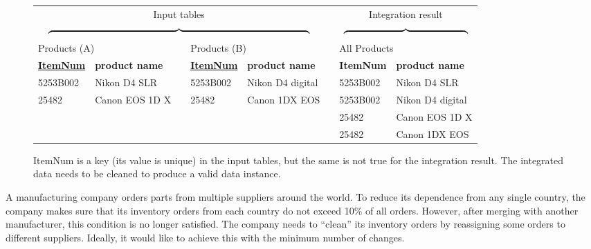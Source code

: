 \begin{figure}
	\small{\begin{tabular}{|l|l|l|l|l|l|l|l|}
		\multicolumn{5}{c}{Input tables} & \multicolumn{1}{l}{}& \multicolumn{2}{c}{Integration result}\\
		\multicolumn{5}{c}{$\overbrace{\rule{9.5cm}{0pt}}$} & \multicolumn{1}{l}{}& \multicolumn{2}{c}{$\overbrace{\rule{4.5cm}{0pt}}$}\\
		\multicolumn{2}{l}{Products (A)} & \multicolumn{1}{l}{} & \multicolumn{2}{l}{Products (B)} & \multicolumn{1}{l}{} & \multicolumn{2}{l}{All Products}\\
		\cline{1-2}\cline{4-5}\cline{7-8}
		\textbf{\underline{ItemNum}} & \textbf{product name} & \multicolumn{1}{l|}{} & \textbf{\underline{ItemNum}} & \textbf{product name} & \multicolumn{1}{l|}{} & \textbf{ItemNum} & \textbf{product name}\\
		\cline{1-2}\cline{4-5}\cline{7-8}
		5253B002 & Nikon D4 SLR & \multicolumn{1}{l|}{} & 5253B002 & Nikon D4 digital & \multicolumn{1}{l|}{} & 5253B002 & Nikon D4 SLR\\
		\cline{1-2}\cline{4-5}\cline{7-8}
		25482 & Canon EOS 1D X & \multicolumn{1}{l|}{} & 25482 & Canon 1DX EOS & \multicolumn{1}{l|}{} & 5253B002 & Nikon D4 digital\\
		\cline{1-2}\cline{4-5}\cline{7-8}
		\multicolumn{6}{l|}{} & 25482 & Canon EOS 1D X\\
		\cline{7-8}
		\multicolumn{6}{l|}{} & 25482 & Canon 1DX EOS\\
		\cline{7-8}
		
	\end{tabular}}
	\caption{ItemNum is a key (its value is unique) in the input tables, but the same is not true for the integration result. The integrated data needs to be cleaned to produce a valid data instance.}\label{fig:integrationExample}
\end{figure}

\begin{example}\label{ex:how-to}
A manufacturing company orders parts from multiple suppliers around
the world. To reduce its dependence from any single country, the
company makes sure that its inventory orders from each country do not
exceed 10\% of all orders. However, after merging with another
manufacturer, this condition is no longer satisfied. The company needs
to ``clean'' its inventory orders by reassigning some orders to
different suppliers. Ideally, it would like to achieve this with the
minimum number of changes.
\end{example}

